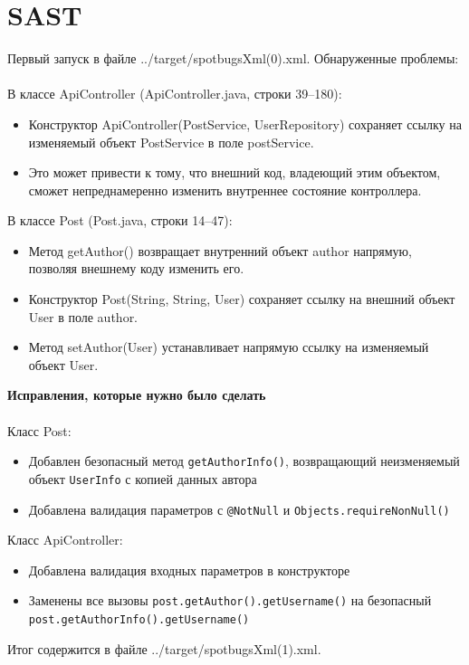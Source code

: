 \documentclass{article}
\begin{document}
\section*{SAST}

Первый запуск в файле ../target/spotbugsXml(0).xml. Обнаруженные проблемы:
\\ \\
В классе ApiController (ApiController.java, строки 39–180):
\begin{itemize}
  \item Конструктор ApiController(PostService, UserRepository) сохраняет ссылку на изменяемый объект PostService в поле postService.
  \item Это может привести к тому, что внешний код, владеющий этим объектом, сможет непреднамеренно изменить внутреннее состояние контроллера.
\end{itemize}
В классе Post (Post.java, строки 14–47):
\begin{itemize}
  \item Метод getAuthor() возвращает внутренний объект author напрямую, позволяя внешнему коду изменить его.
  \item Конструктор Post(String, String, User) сохраняет ссылку на внешний объект User в поле author.
  \item Метод setAuthor(User) устанавливает напрямую ссылку на изменяемый объект User.
\end{itemize}
\textbf{Исправления, которые нужно было сделать}
\\ \\ 
Класс Post:
\begin{itemize}
    \item Добавлен безопасный метод \texttt{getAuthorInfo()}, возвращающий неизменяемый объект \texttt{UserInfo} с копией данных автора
    \item Добавлена валидация параметров с \texttt{@NotNull} и \texttt{Objects.requireNonNull()}
\end{itemize}
Класс ApiController:
\begin{itemize}
    \item Добавлена валидация входных параметров в конструкторе
    \item Заменены все вызовы \texttt{post.getAuthor().getUsername()} на безопасный \texttt{post.getAuthorInfo().getUsername()}
\end{itemize}

Итог содержится в файле  ../target/spotbugsXml(1).xml.
\end{document}
